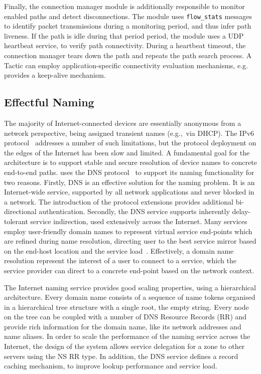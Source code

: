 Finally, the connection manager  module is additionally responsible to monitor
enabled paths and detect disconnections. The module uses \texttt{flow\_stats}
\of messages to identify packet transmissions during a monitoring period, and
thus infer path liveness. If the path is idle during that period period, the
module uses a UDP heartbeat service, to verify path connectivity. During a
heartbeat timeout, the connection manager tears down the path and repeats the
path search  process.  A Tactic can employ application-specific
connectivity evaluation mechanisms, e.g. \openvpn provides a keep-alive mechanism. 

\subsection{Effectful Naming} \label{signpost-naming}

The majority of Internet-connected devices are essentially anonymous from a
network perspective, being assigned transient names (e.g.,~via DHCP). The IPv6
protocol~ addresses a number of such limitations, but the protocol
deployment on the edges of the Internet has been slow and limited. A fundamental
goal for the \signpost architecture is to support stable and secure resolution
of device  names to concrete end-to-end paths.  \signpost uses the DNS
protocol~ to support its naming functionality for two reasons.
Firstly, DNS is an effective solution for the naming problem. It is an
Internet-wide service, supported by all network applications and never blocked
in a network. The introduction of the \dnssec protocol extensions provides
additional bi-directional authentication.  Secondly, the DNS service supports
inherently delay-tolerant service indirection, used extensively across the
Internet.  Many services employ user-friendly domain names to represent virtual
service end-points which are refined during name resolution, directing user to
the best service mirror based on the end-host location and the service
load~. Effectively, a domain name resolution represent the
interest of a user to connect to a service, which the service provider can
direct to a concrete end-point based on the network context.  

The Internet naming service provides good scaling properties, using a
hierarchical architecture. Every domain name consists of a sequence of name
tokens organised in a hierarchical tree structure with a single root, the empty
string. Every node on the tree can be coupled with a number of DNS Resource
Records (RR) and provide rich information for the domain name, like its network
addresses and name aliases. In order to scale the performance of the naming
service across the Internet, the design of the system allows service delegation
for a zone to other servers using the NS RR type.  In addition, the DNS
service defines a record caching mechanism, to improve lookup performance and
service load. 

